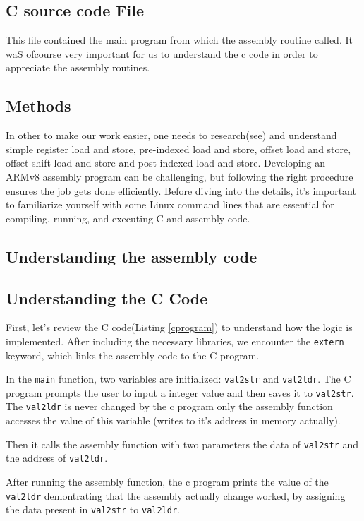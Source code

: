 \subsection*{C source code File} 
This file contained the main program from which the assembly routine called. It waS ofcourse very important for us to understand the 
c code in order to appreciate the assembly routines.  
\subsection*{Methods}
In other to make our work easier, one needs to research(see\cite{arm_load_store}) and understand simple register load and store, pre-indexed load and store, 
offset load and store, offset shift load and store and post-indexed load and store.
Developing an ARMv8 assembly program can be challenging, but following the right procedure ensures the job gets done efficiently. Before diving into the details, it's important to familiarize yourself with some Linux command lines that are essential for compiling, running, and executing C and assembly code.

\subsection*{Understanding the  assembly code}
\subsection*{Understanding the C Code}
First, let's review the C code(Listing \ref{cprogram}) to understand how the logic is implemented. After including the necessary libraries, we encounter the \texttt{extern} keyword, which links the assembly code to the C program.

In the \texttt{main} function, two variables are initialized: \texttt{val2str} and \texttt{val2ldr}. 
The C program prompts the user to input a integer value and then saves it to \texttt{val2str}. The \texttt{val2ldr} is never 
changed by the c program only the
assembly function accesses the value of this variable (writes to it's address in memory actually).

Then it calls the assembly function with two parameters the data of \texttt{val2str} and the address of \texttt{val2ldr}.

After running the assembly function, the c program prints the value of the \texttt{val2ldr} demontrating that the assembly actually 
change worked, by assigning the data present in \texttt{val2str} to \texttt{val2ldr}.

